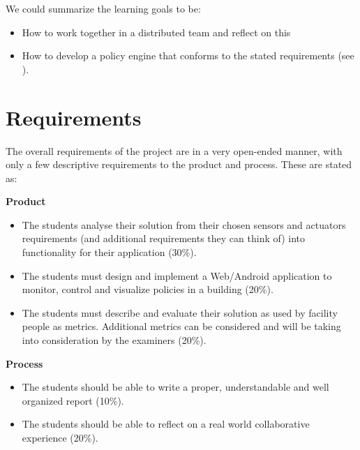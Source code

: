 We could summarize the learning goals to be: 
\begin{itemize}
\item How to work together in a distributed team and reflect on this
\item How to develop a policy engine that conforms to the stated requirements (see ).
\end{itemize}
\section{Requirements} \label{sec:requirements}
The overall requirements of the project are in a very open-ended manner, with only a few descriptive requirements to the product and process. These are stated as:

\textbf{Product}
\begin{itemize}
	\item The students analyse their solution from their chosen sensors and actuators requirements (and additional requirements they can think of) into functionality for their application (30\%).
	\item The students must design and implement a Web/Android application to monitor, control and visualize policies in a building (20\%).
	\item The students must describe and evaluate their solution as used by facility people as metrics. Additional metrics can be considered and will be taking into consideration by the examiners (20\%).
\end{itemize}

\textbf{Process}
\begin{itemize}
	\item The students should be able to write a proper, understandable and well organized report (10\%).
	\item The students should be able to reflect on a real world collaborative experience (20\%).
\end{itemize}
